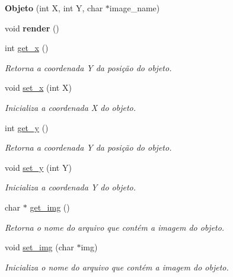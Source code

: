 \begin{DoxyCompactItemize}
\item 
{\bfseries Objeto} (int X, int Y, char $\ast$image\+\_\+name)\hypertarget{classObjeto_a9c9927529170f4d17fd926c83266c7a8}{}\label{classObjeto_a9c9927529170f4d17fd926c83266c7a8}

\item 
void {\bfseries render} ()\hypertarget{classObjeto_a294bd02cea8cbee25f423f37fac91b2a}{}\label{classObjeto_a294bd02cea8cbee25f423f37fac91b2a}

\item 
int \hyperlink{classObjeto_adb11196ab4be9f1cb16d1fdda7b9ae3e}{get\+\_\+x} ()
\begin{DoxyCompactList}\small\item\em Retorna a coordenada Y da posição do objeto. \end{DoxyCompactList}\item 
void \hyperlink{classObjeto_a8fbb753ea08c63f829d647456ad4815a}{set\+\_\+x} (int X)
\begin{DoxyCompactList}\small\item\em Inicializa a coordenada X do objeto. \end{DoxyCompactList}\item 
int \hyperlink{classObjeto_aa20f6660f47e6e45c6a2cde3fede4892}{get\+\_\+y} ()
\begin{DoxyCompactList}\small\item\em Retorna a coordenada Y da posição do objeto. \end{DoxyCompactList}\item 
void \hyperlink{classObjeto_a621ce64fb94c2ef5a7828fd8fbde7130}{set\+\_\+y} (int Y)
\begin{DoxyCompactList}\small\item\em Inicializa a coordenada Y do objeto. \end{DoxyCompactList}\item 
char $\ast$ \hyperlink{classObjeto_ac10714477e91925fcdd59a7a98f55fea}{get\+\_\+img} ()
\begin{DoxyCompactList}\small\item\em Retorna o nome do arquivo que contém a imagem do objeto. \end{DoxyCompactList}\item 
void \hyperlink{classObjeto_aebe9ae03165a9e25fa4677512ea0b6d1}{set\+\_\+img} (char $\ast$img)
\begin{DoxyCompactList}\small\item\em Inicializa o nome do arquivo que contém a imagem do objeto. \end{DoxyCompactList}\end{DoxyCompactItemize}
